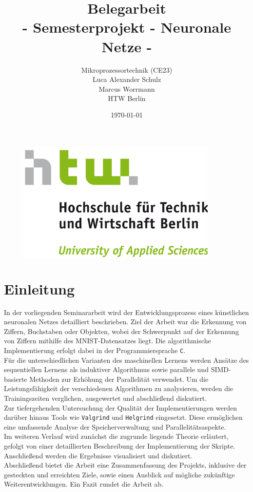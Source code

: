 \documentclass[a4paper, 12pt]{article}
\title{Belegarbeit \\
		- Semesterprojekt - Neuronale Netze -}
\author{Mikroprozessortechnik (CE23) \\
Luca Alexander Schulz\\
Marcus Worrmann\\
HTW Berlin
}
\date{\today}
\begin{document}
	
\maketitle	

\begin{figure}[h]
	\centering
	\includegraphics[width=10cm]{Bilders/htw.png}
\end{figure}

\newpage 
\tableofcontents

\newpage %

\listoffigures
\listoftables
\lstlistoflistings

\newpage %

\section{Einleitung}\label{chapter..1}
In der vorliegenden Seminararbeit wird der Entwicklungsprozess eines künstlichen neuronalen Netzes 
detailliert beschrieben. Ziel der Arbeit war die Erkennung von Ziffern, Buchstaben oder Objekten, wobei 
der Schwerpunkt auf der Erkennung von Ziffern mithilfe des MNIST-Datensatzes \cite{MNIST-Datensatz} liegt. 
Die algorithmische Implementierung erfolgt dabei in der Programmiersprache \texttt{C}.\\
Für die unterschiedlichen Varianten des maschinellen Lernens werden Ansätze des sequentiellen 
Lernens als induktiver Algorithmus sowie parallele und SIMD-basierte Methoden zur Erhöhung der 
Parallelität verwendet. Um die Leistungsfähigkeit der verschiedenen Algorithmen zu analysieren, 
werden die Trainingszeiten verglichen, ausgewertet und abschließend diskutiert.\\
Zur tiefergehenden Untersuchung der Qualität der Implementierungen werden darüber hinaus Tools 
wie \texttt{Valgrind} und \texttt{Helgrind} eingesetzt. Diese ermöglichen eine umfassende Analyse 
der Speicherverwaltung und Parallelitätsaspekte.\\
Im weiteren Verlauf wird zunächst die zugrunde liegende Theorie erläutert, gefolgt von einer 
detaillierten Beschreibung der Implementierung der Skripte. Anschließend werden die Ergebnisse 
visualisiert und diskutiert.\\
Abschließend bietet die Arbeit eine Zusammenfassung des Projekts, inklusive der gesteckten und 
erreichten Ziele, sowie einen Ausblick auf mögliche zukünftige Weiterentwicklungen. Ein Fazit 
rundet die Arbeit ab.
\end{document}
